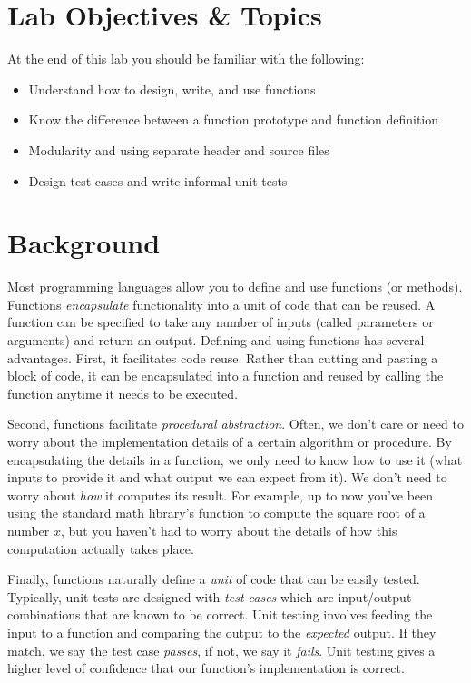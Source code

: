 \documentclass[12pt]{scrartcl}
\begin{document}
\section{Lab Objectives \& Topics}
At the end of this lab you should be familiar with the following:
\begin{itemize}
  \item Understand how to design, write, and use functions
  \item Know the difference between a function prototype and function definition
  \item Modularity and using separate header and source files
  \item Design test cases and write informal unit tests
\end{itemize}

\section{Background}

Most programming languages allow you to define and use functions 
(or methods).  Functions \emph{encapsulate} functionality into a 
unit of code that can be reused.  A function can be specified to 
take any number of inputs (called parameters or arguments) and 
return an output.  Defining and using functions has several advantages.  
First, it facilitates code reuse.  Rather than 
cutting and pasting a block of code, it can be encapsulated 
into a function and reused by calling the function anytime it needs 
to be executed.

Second, functions facilitate \emph{procedural abstraction}.  Often, 
we don't care or need to worry about the implementation 
details of a certain algorithm or procedure.  By encapsulating the 
details in a function, we only need to know how to use it (what 
inputs to provide it and what output we can expect from it).  We
don't need to worry about \emph{how} it computes its result.  For example,
up to now you've been using the standard math library's function
to compute the square root of a number $x$, but you haven't
had to worry about the details of how this computation actually
takes place.

Finally, functions naturally define a \emph{unit} of code that can
be easily tested.  Typically, unit tests are designed with 
\emph{test cases} which are input/output combinations that are
known to be correct.  Unit testing involves feeding the input to
a function and comparing the output to the \emph{expected} output.
If they match, we say the test case \emph{passes}, if not, we say
it \emph{fails}.  Unit testing gives a higher level of confidence
that our function's implementation is correct.
\end{document}
